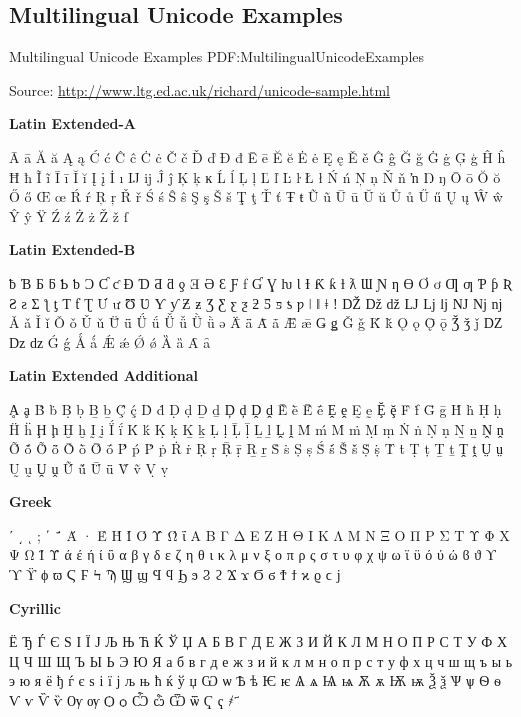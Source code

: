 \documentclass[a4paper,10pt,oneside]{article}
\begin{document}
\begin{body}

\section
{Multilingual Unicode Examples}
{Multilingual Unicode Examples}
{PDF:MultilingualUnicodeExamples}

Source:
\href{http://www.ltg.ed.ac.uk/~richard/unicode-sample.html}
{http://www.ltg.ed.ac.uk/{\TildeSymbol}richard/unicode-sample.html}

\SmallEntryGap
\textbf{Latin Extended-A}
\begin{detail}
Ā ā Ă ă Ą ą Ć ć Ĉ ĉ Ċ ċ Č č Ď ď Đ đ Ē ē Ĕ ĕ Ė ė Ę ę Ě ě Ĝ ĝ Ğ ğ Ġ ġ Ģ ģ Ĥ ĥ Ħ ħ Ĩ ĩ Ī ī Ĭ ĭ Į į İ ı Ĳ ĳ Ĵ ĵ Ķ ķ ĸ Ĺ ĺ Ļ ļ Ľ ľ Ŀ ŀ Ł ł Ń ń Ņ ņ Ň ň ŉ Ŋ ŋ Ō ō Ŏ ŏ Ő ő Œ œ Ŕ ŕ Ŗ ŗ Ř ř Ś ś Ŝ ŝ Ş ş Š š Ţ ţ Ť ť Ŧ ŧ Ũ ũ Ū ū Ŭ ŭ Ů ů Ű ű Ų ų Ŵ ŵ Ŷ ŷ Ÿ Ź ź Ż ż Ž ž ſ
\end{detail}

\SmallEntryGap
\textbf{Latin Extended-B}
\begin{detail}
ƀ Ɓ Ƃ ƃ Ƅ ƅ Ɔ Ƈ ƈ Ɖ Ɗ Ƌ ƌ ƍ Ǝ Ə Ɛ Ƒ ƒ Ɠ Ɣ ƕ Ɩ Ɨ Ƙ ƙ ƚ ƛ Ɯ Ɲ ƞ Ɵ Ơ ơ Ƣ ƣ Ƥ ƥ Ʀ Ƨ ƨ Ʃ ƪ ƫ Ƭ ƭ Ʈ Ư ư Ʊ Ʋ Ƴ ƴ Ƶ ƶ Ʒ Ƹ ƹ ƺ ƻ Ƽ ƽ ƾ ƿ ǀ ǁ ǂ ǃ Ǆ ǅ ǆ Ǉ ǈ ǉ Ǌ ǋ ǌ Ǎ ǎ Ǐ ǐ Ǒ ǒ Ǔ ǔ Ǖ ǖ Ǘ ǘ Ǚ ǚ Ǜ ǜ ǝ Ǟ ǟ Ǡ ǡ Ǣ ǣ Ǥ ǥ Ǧ ǧ Ǩ ǩ Ǫ ǫ Ǭ ǭ Ǯ ǯ ǰ Ǳ ǲ ǳ Ǵ ǵ Ǻ ǻ Ǽ ǽ Ǿ ǿ Ȁ ȁ Ȃ ȃ
\end{detail}

\SmallEntryGap
\textbf{Latin Extended Additional}
\begin{detail}
Ḁ ḁ Ḃ ḃ Ḅ ḅ Ḇ ḇ Ḉ ḉ Ḋ ḋ Ḍ ḍ Ḏ ḏ Ḑ ḑ Ḓ ḓ Ḕ ḕ Ḗ ḗ Ḙ ḙ Ḛ ḛ Ḝ ḝ Ḟ ḟ Ḡ ḡ Ḣ ḣ Ḥ ḥ Ḧ ḧ Ḩ ḩ Ḫ ḫ Ḭ ḭ Ḯ ḯ Ḱ ḱ Ḳ ḳ Ḵ ḵ Ḷ ḷ Ḹ ḹ Ḻ ḻ Ḽ ḽ Ḿ ḿ Ṁ ṁ Ṃ ṃ Ṅ ṅ Ṇ ṇ Ṉ ṉ Ṋ ṋ Ṍ ṍ Ṏ ṏ Ṑ ṑ Ṓ ṓ Ṕ ṕ Ṗ ṗ Ṙ ṙ Ṛ ṛ Ṝ ṝ Ṟ ṟ Ṡ ṡ Ṣ ṣ Ṥ ṥ Ṧ ṧ Ṩ ṩ Ṫ ṫ Ṭ ṭ Ṯ ṯ Ṱ ṱ Ṳ ṳ Ṵ ṵ Ṷ ṷ Ṹ ṹ Ṻ ṻ Ṽ ṽ Ṿ ṿ
\end{detail}

\SmallEntryGap
\textbf{Greek}
\begin{detail}
ʹ ͵ ͺ ; ΄ ΅ Ά · Έ Ή Ί Ό Ύ Ώ ΐ Α Β Γ Δ Ε Ζ Η Θ Ι Κ Λ Μ Ν Ξ Ο Π Ρ Σ Τ Υ Φ Χ Ψ Ω Ϊ Ϋ ά έ ή ί ΰ α β γ δ ε ζ η θ ι κ λ μ ν ξ ο π ρ ς σ τ υ φ χ ψ ω ϊ ϋ ό ύ ώ ϐ ϑ ϒ ϓ ϔ ϕ ϖ Ϛ Ϝ Ϟ Ϡ Ϣ ϣ Ϥ ϥ Ϧ ϧ Ϩ ϩ Ϫ ϫ Ϭ ϭ Ϯ ϯ ϰ ϱ ϲ ϳ
\end{detail}

\SmallEntryGap
\textbf{Cyrillic}
\begin{detail}
Ё Ђ Ѓ Є Ѕ І Ї Ј Љ Њ Ћ Ќ Ў Џ А Б В Г Д Е Ж З И Й К Л М Н О П Р С Т У Ф Х Ц Ч Ш Щ Ъ Ы Ь Э Ю Я а б в г д е ж з и й к л м н о п р с т у ф х ц ч ш щ ъ ы ь э ю я ё ђ ѓ є ѕ і ї ј љ њ ћ ќ ў џ Ѡ ѡ Ѣ ѣ Ѥ ѥ Ѧ ѧ Ѩ ѩ Ѫ ѫ Ѭ ѭ Ѯ ѯ Ѱ ѱ Ѳ ѳ Ѵ ѵ Ѷ ѷ Ѹ ѹ Ѻ ѻ Ѽ ѽ Ѿ ѿ Ҁ ҁ ҂ ҃
\end{detail}


\end{body}
\end{document}
